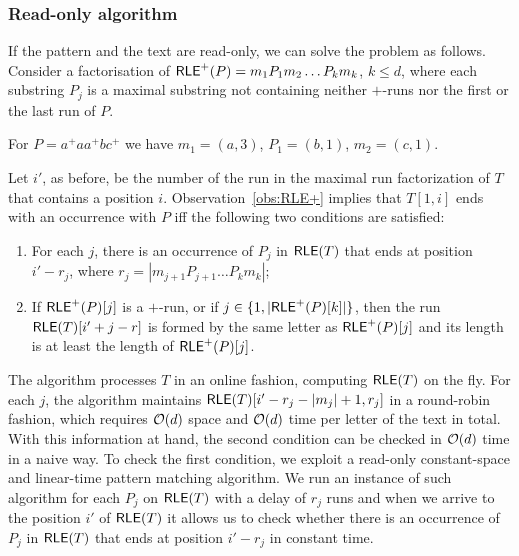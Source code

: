 \documentclass{article}
\begin{document}



\subsubsection{Read-only algorithm}
If the pattern and the text are read-only, we can solve the problem as follows. Consider a factorisation of $\textsf{RLE}^+(P) = m_1 P_1 m_2 \ldots P_k m_k$, $k \le d$, where each substring $P_j$ is a maximal substring not containing neither $+$-runs nor the first or the last run of $P$. 

\begin{example}
For $P = a^+ a a^+ b c^+$ we have $m_1 = (a,3)$, $P_1 = (b,1)$, $m_2 = (c,1)$. 
\end{example}

Let $i'$, as before, be the number of the run in the maximal run factorization of $T$ that contains a position $i$. Observation~\ref{obs:RLE+} implies that $T[1,i]$ ends with an occurrence with $P$ iff the following two conditions are satisfied:
\begin{enumerate}
\item For each $j$, there is an occurrence of $P_j$ in $\textsf{RLE}(T)$ that ends at position $i'-r_j$, where $r_j = |m_{j+1} P_{j+1} \ldots P_k m_k|$; 
\item If $\textsf{RLE}^+(P)[j]$ is a $+$-run, or if $j \in \{1,|\textsf{RLE}^+(P)[k]|\}$, then the run $\textsf{RLE}(T)[i'+ j -r]$ is formed by the same letter as $\textsf{RLE}^+(P)[j]$ and its length is at least the length of $\textsf{RLE}^+(P)[j]$. 
\end{enumerate}

The algorithm processes $T$ in an online fashion, computing $\textsf{RLE}(T)$ on the fly. For each $j$, the algorithm maintains $\textsf{RLE}(T)[i'-r_j-|m_j|+1, r_j]$ in a round-robin fashion, which requires $\mathcal{O}(d)$ space and $\mathcal{O}(d)$ time per letter of the text in total. With this information at hand, the second condition can be checked in $\mathcal{O}(d)$ time in a naive way. To check the first condition, we exploit a read-only constant-space and linear-time pattern matching algorithm. We run an instance of such algorithm for each $P_j$ on $\textsf{RLE}(T)$ with a delay of $r_j$ runs and when we arrive to the position $i'$ of $\textsf{RLE}(T)$ it allows us to check whether there is an occurrence of $P_j$ in $\textsf{RLE}(T)$ that ends at position $i'-r_j$ in constant time.
\end{document}
